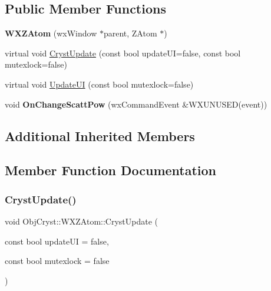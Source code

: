 \subsection*{Public Member Functions}
\begin{DoxyCompactItemize}
\item 
\mbox{\label{class_obj_cryst_1_1_w_x_z_atom_a040ca5188cd44e509fb1f6d226906696}} 
{\bfseries W\+X\+Z\+Atom} (wx\+Window $\ast$parent, Z\+Atom $\ast$)
\item 
virtual void \mbox{\hyperlink{class_obj_cryst_1_1_w_x_z_atom_af5872f558b7828759bbcd07a3a5aa53b}{Cryst\+Update}} (const bool update\+UI=false, const bool mutexlock=false)
\item 
virtual void \mbox{\hyperlink{class_obj_cryst_1_1_w_x_z_atom_ad98ce4a82eb861cb2fafbddb7ab9bfbe}{Update\+UI}} (const bool mutexlock=false)
\item 
\mbox{\label{class_obj_cryst_1_1_w_x_z_atom_a60299987b5a652ab1c3e27636f017e99}} 
void {\bfseries On\+Change\+Scatt\+Pow} (wx\+Command\+Event \&W\+X\+U\+N\+U\+S\+ED(event))
\end{DoxyCompactItemize}
\subsection*{Additional Inherited Members}


\subsection{Member Function Documentation}
\mbox{\label{class_obj_cryst_1_1_w_x_z_atom_af5872f558b7828759bbcd07a3a5aa53b}} 
\subsubsection{\texorpdfstring{CrystUpdate()}{CrystUpdate()}}
{\footnotesize\ttfamily void Obj\+Cryst\+::\+W\+X\+Z\+Atom\+::\+Cryst\+Update (\begin{DoxyParamCaption}\item[{const bool}]{update\+UI = {\ttfamily false},  }\item[{const bool}]{mutexlock = {\ttfamily false} }\end{DoxyParamCaption})\hspace{0.3cm}{\ttfamily [virtual]}}

